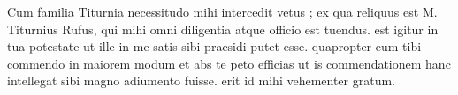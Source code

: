 


Cum familia Titurnia necessitudo mihi intercedit vetus ; ex qua reliquus est M. Titurnius Rufus, qui mihi omni diligentia atque officio est tuendus. est igitur in tua potestate ut ille in me satis sibi praesidi putet esse. quapropter eum tibi commendo in maiorem modum et abs te peto efficias ut is commendationem hanc intellegat sibi magno adiumento fuisse. erit id mihi vehementer gratum.
